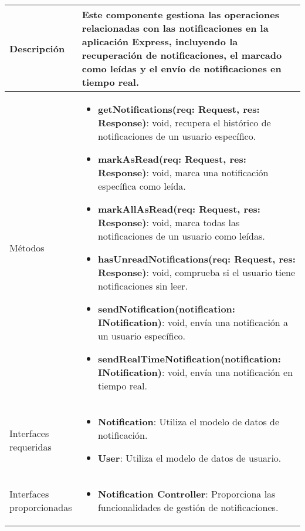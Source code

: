 \begin{longtable}{
    >{\columncolor{lightgreen!20}}p{4cm}
    p{12cm}
    }
    \midrule
    Descripción & Este componente gestiona las operaciones relacionadas con las notificaciones en la aplicación Express, incluyendo la recuperación de notificaciones, el marcado como leídas y el envío de notificaciones en tiempo real. \\
    \midrule
    Métodos & \begin{itemize}[nosep,leftmargin=*]
      \item \textbf{getNotifications(req: Request, res: Response)}: void, recupera el histórico de notificaciones de un usuario específico.
      \item \textbf{markAsRead(req: Request, res: Response)}: void, marca una notificación específica como leída.
      \item \textbf{markAllAsRead(req: Request, res: Response)}: void, marca todas las notificaciones de un usuario como leídas.
      \item \textbf{hasUnreadNotifications(req: Request, res: Response)}: void, comprueba si el usuario tiene notificaciones sin leer.
      \item \textbf{sendNotification(notification: INotification)}: void, envía una notificación a un usuario específico.
      \item \textbf{sendRealTimeNotification(notification: INotification)}: void, envía una notificación en tiempo real.
    \end{itemize} \\
    \midrule
    Interfaces requeridas & \begin{itemize}[nosep,leftmargin=*]
      \item \textbf{Notification}: Utiliza el modelo de datos de notificación.
      \item \textbf{User}: Utiliza el modelo de datos de usuario.
    \end{itemize} \\
    \midrule
    Interfaces proporcionadas & \begin{itemize}[nosep,leftmargin=*]
      \item \textbf{Notification Controller}: Proporciona las funcionalidades de gestión de notificaciones.
    \end{itemize} \\
    \end{longtable}


